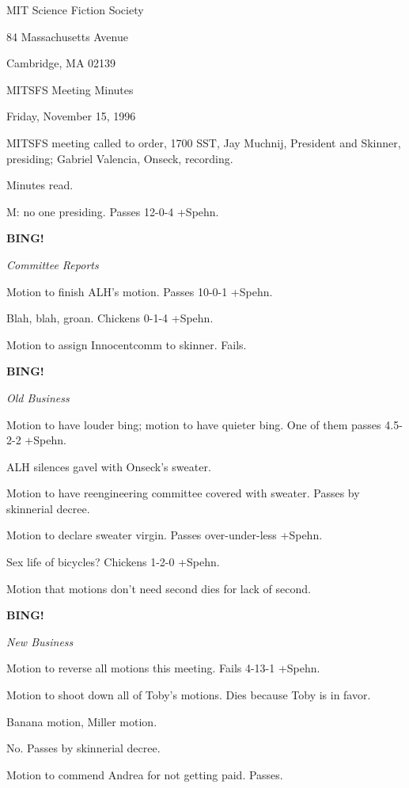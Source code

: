 \documentclass[12pt]{article}
\newcommand{\bing}{{\bf BING!} }
\newcommand{\goto}[1]{\bing \vskip 12pt \centerline{{\em{#1}}}}
\begin{document}
\begin{center}

MIT Science Fiction Society 

84 Massachusetts Avenue

Cambridge, MA 02139

\vspace{12pt}

MITSFS Meeting Minutes 

Friday, November 15, 1996

\end{center}
 
\vspace{18pt}

\setlength{\parskip}{6pt}

\noindent
MITSFS meeting called to order, 1700 SST,
Jay Muchnij, President and Skinner, presiding; Gabriel Valencia, Onseck, recording.

Minutes read.

M: no one presiding. Passes 12-0-4 +Spehn.

\goto{Committee Reports}

Motion to finish ALH's motion. Passes 10-0-1 +Spehn.

Blah, blah, groan. Chickens 0-1-4 +Spehn.

Motion to assign Innocentcomm to skinner. Fails.

\goto{Old Business}

Motion to have louder bing; motion to have quieter bing. One of them passes 4.5-2-2 +Spehn.

ALH silences gavel with Onseck's sweater.

Motion to have reengineering committee covered with sweater. Passes by skinnerial decree.

Motion to declare sweater virgin. Passes over-under-less +Spehn.

Sex life of bicycles? Chickens 1-2-0 +Spehn.

Motion that motions don't need second dies for lack of second.

\goto{New Business}

Motion to reverse all motions this meeting. Fails 4-13-1 +Spehn.

Motion to shoot down all of Toby's motions. Dies because Toby is in favor.

Banana motion, Miller motion.

No. Passes by skinnerial decree.

Motion to commend Andrea for not getting paid. Passes.
\end{document}
